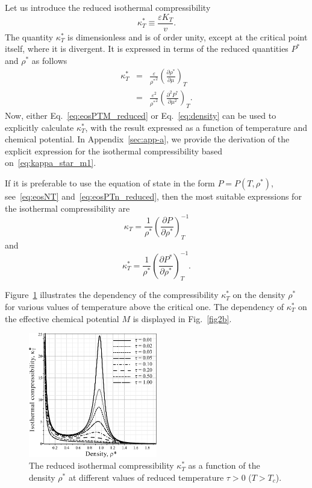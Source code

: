 Let us introduce the reduced isothermal compressibility
\begin{equation}
	\kappa^*_T \equiv \frac{\varepsilon K_T}{v}.
\end{equation}
The quantity $\kappa^*_T$ is dimensionless and is of order unity, except at the critical point itself, where it is divergent. It is expressed in terms of the reduced quantities $P^*$ and $\rho^*$ as follows
\begin{eqnarray}
	\label{eq:kappa_star_m1}
	\kappa^*_T & = & \frac{\varepsilon}{{\rho^*}^2} \left(\frac{\partial \rho^*}{\partial \mu}\right)_T
	\\
	\label{eq:kappa_star_m}
	& = & \frac{\varepsilon^2}{{\rho^*}^2} \left(\frac{\partial^2 P^*}{\partial \mu^2}\right)_T.
\end{eqnarray}
Now, either Eq.~\eqref{eq:eosPTM_reduced} or Eq.~\eqref{eq:density} can be used to explicitly calculate $\kappa^*_T$, with the result expressed as a function of temperature and chemical potential. In Appendix~\ref{sec:app-a}, we provide the derivation of the explicit expression for the isothermal compressibility based on~\eqref{eq:kappa_star_m1}.

If it is preferable to use the equation of state in the form $P=P(T, \rho^*)$, see~\eqref{eq:eosNT} and~\eqref{eq:eosPTn_reduced}, then the most suitable expressions for the isothermal compressibility are
\begin{equation}
	\kappa_T = \frac{1}{\rho^*} \left(\frac{\partial P}{\partial \rho^*}\right)^{-1}_T
\end{equation}
and 
\begin{equation}
	\kappa^*_T = \frac{1}{\rho^*} \left(\frac{\partial P^*}{\partial \rho^*}\right)^{-1}_T.
\end{equation}

Figure~\ref{fig2a} illustrates the dependency of the compressibility $\kappa^*_T$ on the density $\rho^*$ for various values of temperature above the critical one. The dependency of $\kappa^*_T$ on the effective chemical potential $M$ is displayed in Fig.~\ref{fig2b}.

\begin{figure}[htbp]
	\includegraphics[width=0.5\textwidth]{f2a.pdf}
	\vskip-3mm
	\caption{The reduced isothermal compressibility $\kappa^*_T$ as a function of the density $\rho^*$ at different values of reduced temperature $\tau > 0$ ($T > T_c$). 
	}
	\label{fig2a}
\end{figure}

